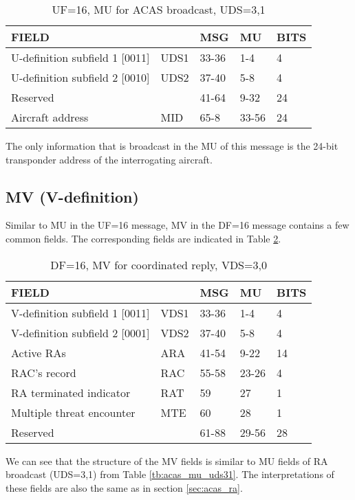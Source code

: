 \begin{table}[ht]
\caption{UF=16, MU for ACAS broadcast, UDS=3,1}
\label{tb:acas_mu_uds32}
\begin{tabular}{|l|l|l|l|l|}
\hline
\textbf{FIELD} & \textbf{} & \textbf{MSG} & \textbf{MU} & \textbf{BITS} \\ \hline
U-definition subfield 1 [0011] & UDS1 & 33-36 & 1-4 & 4 \\ \hline
U-definition subfield 2 [0010] & UDS2 & 37-40 & 5-8 & 4 \\ \hline
Reserved &  & 41-64 & 9-32 & 24 \\ \hline
Aircraft address & MID & 65-8 & 33-56 & 24 \\ \hline
\end{tabular}
\end{table}

The only information that is broadcast in the MU of this message is the 24-bit transponder address of the interrogating aircraft.


\subsection{MV (V-definition)}

Similar to MU in the UF=16 message, MV in the DF=16 message contains a few common fields. The corresponding fields are indicated in Table \ref{tb:acas_mv_vds30}.

\begin{table}[ht]
\caption{DF=16, MV for coordinated reply, VDS=3,0}
\label{tb:acas_mv_vds30}
\begin{tabular}{|l|l|l|l|l|}
\hline
\textbf{FIELD} & \textbf{} & \textbf{MSG} & \textbf{MU} & \textbf{BITS} \\ \hline
V-definition subfield 1 [0011] & VDS1 & 33-36 & 1-4 & 4 \\ \hline
V-definition subfield 2 [0001] & VDS2 & 37-40 & 5-8 & 4 \\ \hline
Active RAs & ARA & 41-54 & 9-22 & 14 \\ \hline
RAC's record & RAC & 55-58 & 23-26 & 4 \\ \hline
RA terminated indicator & RAT & 59 & 27 & 1 \\ \hline
Multiple threat encounter & MTE & 60 & 28 & 1 \\ \hline
Reserved &  & 61-88 & 29-56 & 28 \\ \hline
\end{tabular}
\end{table}

We can see that the structure of the MV fields is similar to MU fields of RA broadcast (UDS=3,1) from Table \ref{tb:acas_mu_uds31}. The interpretations of these fields are also the same as in section \ref{sec:acas_ra}.
